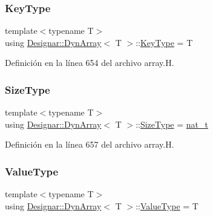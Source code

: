 \subsubsection{\texorpdfstring{Key\+Type}{KeyType}}
{\footnotesize\ttfamily template$<$typename T$>$ \\
using \hyperlink{class_designar_1_1_dyn_array}{Designar\+::\+Dyn\+Array}$<$ T $>$\+::\hyperlink{class_designar_1_1_fixed_array_a3a725cf21783340b8aca29dd1db0acf0}{Key\+Type} =  T}



Definición en la línea 654 del archivo array.\+H.

\mbox{\label{class_designar_1_1_dyn_array_a830e5247348d7d54c65d25f77ecc74bb}} 
\subsubsection{\texorpdfstring{Size\+Type}{SizeType}}
{\footnotesize\ttfamily template$<$typename T$>$ \\
using \hyperlink{class_designar_1_1_dyn_array}{Designar\+::\+Dyn\+Array}$<$ T $>$\+::\hyperlink{class_designar_1_1_fixed_array_a503ae414cc313d248e77c08e62ef043c}{Size\+Type} =  \hyperlink{namespace_designar_aa72662848b9f4815e7bf31a7cf3e33d1}{nat\+\_\+t}}



Definición en la línea 657 del archivo array.\+H.

\mbox{\label{class_designar_1_1_dyn_array_a1df36ad5f778935dcd565138afc155a4}} 
\subsubsection{\texorpdfstring{Value\+Type}{ValueType}}
{\footnotesize\ttfamily template$<$typename T$>$ \\
using \hyperlink{class_designar_1_1_dyn_array}{Designar\+::\+Dyn\+Array}$<$ T $>$\+::\hyperlink{class_designar_1_1_fixed_array_ac1cfeb4403a2dcbffd7ef494e5b873d0}{Value\+Type} =  T}



